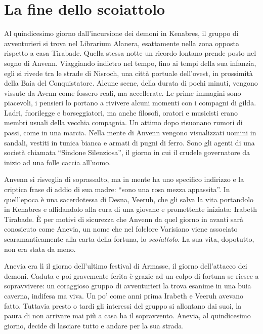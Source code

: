 \chapter{La fine dello scoiattolo}
\label{chp:cap3}

Al quindicesimo giorno dall'incursione dei demoni in Kenabres, il gruppo di avventurieri si trova nel Librarium Alanera, esattamente nella zona opposta rispetto a casa Tirabade. Quella stessa notte un ricordo lontano prende posto nel sogno di Anvenn. Viaggiando indietro nel tempo, fino ai tempi della sua infanzia, egli si rivede tra le strade di Nisroch, una citt\`a portuale dell'ovest, in prossimit\`a della Baia del Conquistatore. Alcune scene, della durata di pochi minuti, vengono vissute da Avenn come fossero reali, ma accellerate. Le prime immagini sono piacevoli, i pensieri lo portano a rivivere alcuni momenti con i compagni di gilda. Ladri, fuorilegge e borseggiatori, ma anche filosofi, oratori e musicisti erano membri usuali della vecchia compagnia. Un attimo dopo risuonano rumori di passi, come in una marcia. Nella mente di Anvenn vengono visualizzati uomini in sandali, vestiti in tunica bianca e armati di pugni di ferro. Sono gli agenti di una societ\`a chiamata ``Sindone Silenziosa'', il giorno in cui il crudele governatore da inizio ad una folle caccia all'uomo.

Anvenn si risveglia di soprassalto, ma in mente ha uno specifico indirizzo e la criptica frase di addio di sua madre: ``sono una rosa mezza appassita''. In quell'epoca \`e una sacerdotessa di Desna, Veeruh, che gli salva la vita portandolo in Kenabres e affidandolo alla cura di una giovane e promettente iniziata: Irabeth Tirabade. \`E per motivi di sicurezza che Anvenn da quel giorno in avanti sar\`a conosicuto come Anevia, un nome che nel folclore Varisiano viene associato scaramanticamente alla carta della fortuna, lo \emph{scoiattolo}. La sua vita, dopotutto, non era stata da meno.

Anevia era l\`i il giorno dell'ultimo festival di Armasse, il giorno dell'attacco dei demoni. Caduta e poi gravemente ferita \`e grazie ad un colpo di fortuna se riesce a sopravvivere: un coraggioso gruppo di avventurieri la trova esanime in una buia caverna, indifesa ma viva. Un po' come anni prima Irabeth e Veeruh avevano fatto. Tuttavia presto o tardi gli interessi del gruppo si allontano dai suoi, la paura di non arrivare mai pi\`u a casa ha il sopravvento. Anevia, al quindicesimo giorno, decide di lasciare tutto e andare per la sua strada.


